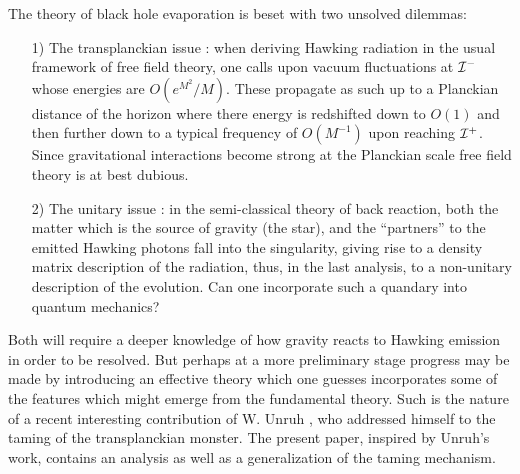 \documentclass[12pt]{article}
\begin{document}
The theory of black hole evaporation \cite{Hawk} is beset with two unsolved
dilemmas: \begin{itemize}
\item[1)] The transplanckian issue \cite{THooft}\cite{Jacobson1}: when deriving
Hawking radiation in the usual framework of free field theory, one calls upon
vacuum fluctuations at $ {\cal I}^-$ \cite{EMP}\cite{MaPa} 
whose energies are $ O (e^{M^2} / M)$.
These propagate as such up to a Planckian distance of 
the horizon where there
energy is redshifted down to $O(1)$ and then further 
down to a typical frequency of $ O (M^{-1})$ upon reaching
$ {\cal
I}^+$.
Since gravitational interactions become strong at the
Planckian scale free field theory is at best dubious.

\item[2)] The unitary issue \cite{Hawk3}:  in the semi-classical theory of back
reaction, both the matter which is the source of gravity (the star), and the
``partners'' to the emitted Hawking photons fall into the singularity, giving
rise to a density matrix description of the radiation, thus, in the last
analysis, to a non-unitary description of the evolution. Can one incorporate
such a quandary into quantum mechanics?

\end{itemize}



\noindent Both will require a deeper knowledge of how gravity reacts to Hawking
emission in order to be resolved. But perhaps at a more preliminary stage
progress may be made by introducing an effective theory which one guesses
incorporates some of the features which might emerge from the fundamental
theory. Such is the nature of a recent interesting contribution of W.
Unruh \cite{Un94}, who addressed himself to the taming of the transplanckian monster.
The present paper, inspired by Unruh's work, contains an analysis as well as a
generalization of the taming mechanism.
\end{document}
